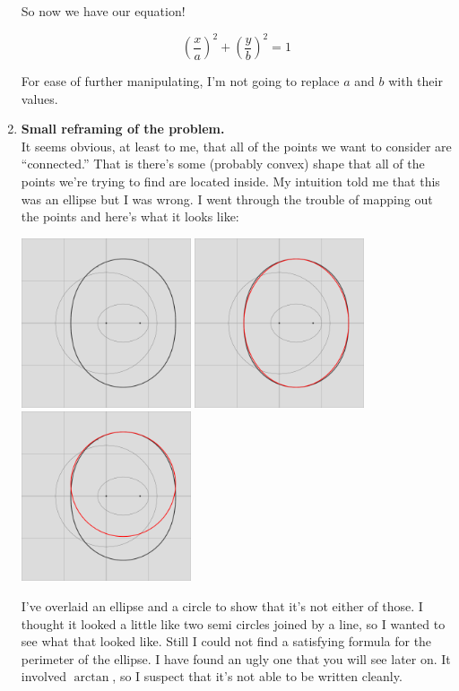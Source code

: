 \documentclass[11pt, oneside]{article}
\begin{document}
\begin{enumerate}
		So now we have our equation!

		$$\left(\frac x a\right)^2 + \left(\frac y b\right)^2 = 1$$

		For ease of further manipulating, I'm not going to replace $a$ and $b$ with their values.
		
		\newpage
	\item \textbf{Small reframing of the problem.}\\
		It seems obvious, at least to me, that all of the points we want to consider are ``connected.'' That is there's some (probably convex) shape that 
		all of the points we're trying to find are located inside. My intuition told me that this was an ellipse but I was wrong. I went through the 
		trouble of mapping out the points and here's what it looks like:

		\includegraphics[height=5cm]{boundary to search}
		\includegraphics[height=5cm]{boundary is not ellipse} 
		\includegraphics[height=5cm]{boundary not circle}

		I've overlaid an ellipse and a circle to show that it's not either of those. I thought it looked a little like two semi circles joined by a line, 
		so I wanted to see what that looked like. Still I could not find a satisfying formula for the perimeter of the ellipse. I have found an ugly one
		that you will see later on. It involved $\arctan$, so I suspect that it's not able to be written cleanly.


\end{enumerate}
\end{document}
